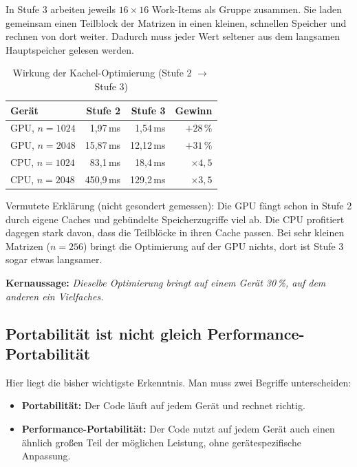 \documentclass[11pt]{article}
\newcommand{\kernaussage}[1]{\par\smallskip\noindent\textbf{Kernaussage:} \emph{#1}\par\smallskip}
\begin{document}
In Stufe 3 arbeiten jeweils $16 \times 16$ Work-Items als Gruppe
zusammen. Sie laden gemeinsam einen Teilblock der Matrizen in einen
kleinen, schnellen Speicher und rechnen von dort weiter. Dadurch muss
jeder Wert seltener aus dem langsamen Hauptspeicher gelesen werden.

\begin{table}[h]
\centering
\begin{tabular}{@{}lrrr@{}}
\toprule
\textbf{Gerät} & \textbf{Stufe 2} & \textbf{Stufe 3} & \textbf{Gewinn} \\
\midrule
GPU, $n = 1024$ & 1{,}97\,ms & 1{,}54\,ms & $+28\,\%$ \\
GPU, $n = 2048$ & 15{,}87\,ms & 12{,}12\,ms & $+31\,\%$ \\
CPU, $n = 1024$ & 83{,}1\,ms & 18{,}4\,ms & $\times 4{,}5$ \\
CPU, $n = 2048$ & 450{,}9\,ms & 129{,}2\,ms & $\times 3{,}5$ \\
\bottomrule
\end{tabular}
\caption{Wirkung der Kachel-Optimierung (Stufe 2 $\rightarrow$ Stufe 3)}
\end{table}

Vermutete Erklärung (nicht gesondert gemessen): Die GPU fängt schon in
Stufe 2 durch eigene Caches und gebündelte Speicherzugriffe viel ab. Die
CPU profitiert dagegen stark davon, dass die Teilblöcke in ihren Cache
passen. Bei sehr kleinen Matrizen ($n = 256$) bringt die Optimierung auf
der GPU nichts, dort ist Stufe 3 sogar etwas langsamer.

\kernaussage{Dieselbe Optimierung bringt auf einem Gerät 30\,\%, auf dem anderen
ein Vielfaches.}

\subsection{Portabilität ist nicht gleich Performance-Portabilität}

Hier liegt die bisher wichtigste Erkenntnis. Man muss zwei Begriffe
unterscheiden:

\begin{itemize}
    \item \textbf{Portabilität:} Der Code läuft auf jedem Gerät und
    rechnet richtig.
    \item \textbf{Performance-Portabilität:} Der Code nutzt auf jedem Gerät
    auch einen ähnlich großen Teil der möglichen Leistung, ohne
    gerätespezifische Anpassung.
\end{itemize}
\end{document}
